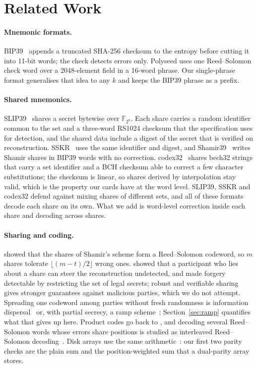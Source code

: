 \documentclass[numeric]{anvil-paper}
\newcommand{\F}{\mathbb{F}}
\begin{document}
\section{Related Work}
\label{sec:related}

\paragraph{Mnemonic formats.}
BIP39~\citep{bip39} appends a truncated SHA-256 checksum to the entropy before
cutting it into 11-bit words; the check detects errors only. Polyseed
\citep{polyseed} uses one Reed--Solomon check word over a 2048-element field in
a 16-word phrase. Our single-phrase format generalises that idea to any $k$ and
keeps the BIP39 phrase as a prefix.

\paragraph{Shared mnemonics.}
SLIP39~\citep{slip39} shares a secret bytewise over $\F_{2^8}$. Each share
carries a random identifier common to the set and a three-word RS1024 checksum
that the specification uses for detection, and the shared data include a
digest of the secret that is verified on reconstruction. SSKR~\citep{sskr}
uses the same identifier and digest, and Shamir39~\citep{shamir39} writes
Shamir shares in BIP39 words with no correction. codex32~\citep{bip93} shares bech32 strings that carry
a set identifier and a BCH checksum able to correct a few character
substitutions; the checksum is linear, so shares derived by interpolation stay
valid, which is the property our cards have at the word level. SLIP39, SSKR and codex32
defend against mixing shares of different sets, and all of these formats
decode each share on its own. What we add is word-level correction inside each share and
decoding across shares.

\paragraph{Sharing and coding.}
\citet{mceliece1981sharing} showed that the shares of Shamir's scheme form a
Reed--Solomon codeword, so $m$ shares tolerate $\lfloor (m-t)/2\rfloor$ wrong
ones. \citet{tompa1989how} showed that a participant who lies about a share can
steer the reconstruction undetected, and made forgery detectable by
restricting the set of legal secrets; robust and verifiable sharing
\citep{rabin1989verifiable} gives stronger guarantees against malicious
parties, which we do not attempt. Spreading one codeword among parties without
fresh randomness is information dispersal~\citep{rabin1989efficient} or, with
partial secrecy, a ramp scheme~\citep{blakley1985security,
franklin1992communication}; Section~\ref{sec:ramp} quantifies what that gives
up here. Product codes go back to \citet{elias1954error}, and decoding several
Reed--Solomon words whose errors share positions is studied as interleaved
Reed--Solomon decoding~\citep{schmidt2009collaborative}. Disk arrays use the
same arithmetic~\citep{patterson1988case, plank1997tutorial}: our first two
parity checks are the plain sum and the position-weighted sum that a
dual-parity array stores.
\end{document}

